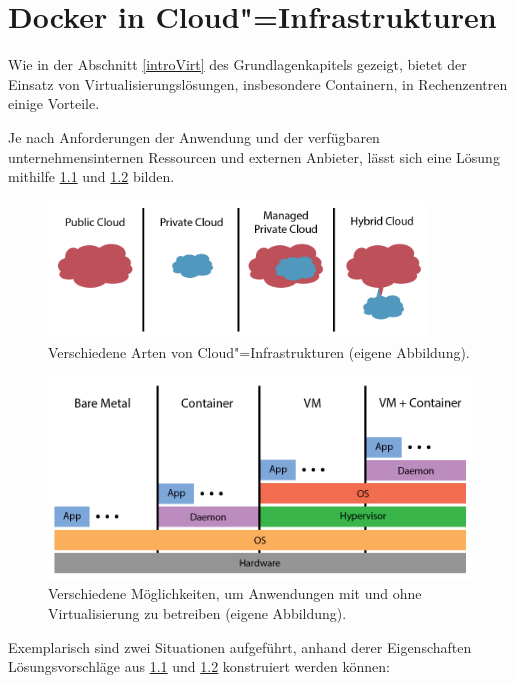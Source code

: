 \documentclass[../main.tex]{subfiles}
\begin{document}
\chapter{Docker in Cloud"=Infrastrukturen}
\label{secInfrastructure}
  Wie in der Abschnitt \ref{introVirt} des Grundlagenkapitels gezeigt, bietet der Einsatz von Virtualisierungslösungen, insbesondere Containern, in Rechenzentren einige Vorteile.

  Je nach Anforderungen der Anwendung und der verfügbaren unternehmensinternen Ressourcen und externen Anbieter, lässt sich eine Lösung mithilfe \fig \ref{fig:infrastructure_cloud} und \fig \ref{fig:infrastructure_deployment} bilden.

  \begin{figure}[!h]
      \centering
      \includegraphics[width=0.9\textwidth]{./images/infrastructure_cloud.png}
      \caption{Verschiedene Arten von Cloud"=Infrastrukturen (eigene Abbildung).}
      \label{fig:infrastructure_cloud}
  \end{figure}
  \clearpage
  \begin{figure}[!h]
      \centering
      \includegraphics[width=1\textwidth]{./images/infrastructure_deployment.png}
      \caption{Verschiedene Möglichkeiten, um Anwendungen mit und ohne Virtualisierung zu betreiben (eigene Abbildung).}
      \label{fig:infrastructure_deployment}
  \end{figure}

  Exemplarisch sind zwei Situationen aufgeführt, anhand derer Eigenschaften Lösungsvorschläge aus \fig \ref{fig:infrastructure_cloud} und \ref{fig:infrastructure_deployment} konstruiert werden können:
\end{document}
